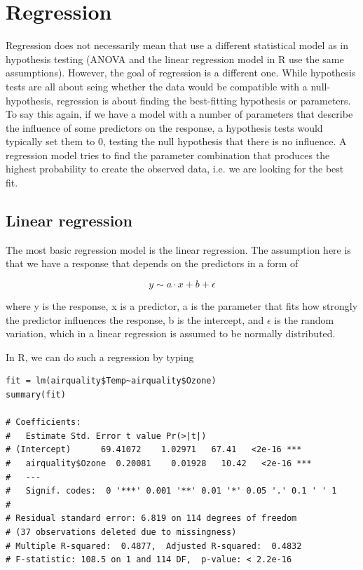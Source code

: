 \documentclass[a4paper,twoside]{tufte-book} %
\begin{document}
\chapter{Regression}

Regression does not necessarily mean that use a different statistical model as in hypothesis testing (ANOVA and the linear regression model in R use the same assumptions). However, the goal of regression is a different one. While hypothesis tests are all about seing whether the data would be compatible with a null-hypothesis, regression is about finding the best-fitting hypothesis or parameters. To say this again, if we have a model with a number of parameters that describe the influence of some predictors on the response, a hypothesis tests would typically set them to 0, testing the null hypothesis that there is no influence. A regression model tries to find the parameter combination that produces the highest probability to create the observed data, i.e. we are looking for the best fit.

\section{Linear regression}

The most basic regression model is the linear regression. The assumption here is that we have a response that depends on the predictors in a form of 

\begin{equation} \label{eq: linear regression}
y \sim a \cdot x + b + \epsilon 
\end{equation}

where y is the response, x is a predictor, a is the parameter that fits how strongly the predictor influences the response, b is the intercept, and $\epsilon$ is the random variation, which in a linear regression is assumed to be normally distributed. 

In R, we can do such a regression by typing

\begin{lstlisting}
fit = lm(airquality$Temp~airquality$Ozone)
summary(fit)

# Coefficients:
#   Estimate Std. Error t value Pr(>|t|)    
# (Intercept)      69.41072    1.02971   67.41   <2e-16 ***
#   airquality$Ozone  0.20081    0.01928   10.42   <2e-16 ***
#   ---
#   Signif. codes:  0 '***' 0.001 '**' 0.01 '*' 0.05 '.' 0.1 ' ' 1
# 
# Residual standard error: 6.819 on 114 degrees of freedom
# (37 observations deleted due to missingness)
# Multiple R-squared:  0.4877,  Adjusted R-squared:  0.4832 
# F-statistic: 108.5 on 1 and 114 DF,  p-value: < 2.2e-16
\end{lstlisting}
\end{document}

